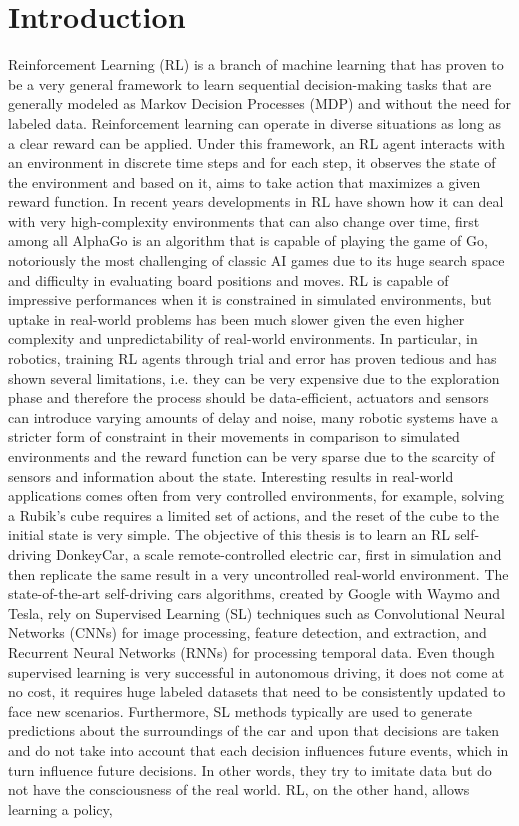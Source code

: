 \chapter{Introduction}

Reinforcement Learning (RL) is a branch of machine learning that has proven to be a very general framework to learn sequential decision-making tasks that are generally modeled as Markov Decision Processes (MDP) \citep{vanOtterlo2012} and without the need for labeled data. Reinforcement learning can operate in diverse situations as long as a clear reward can be applied. Under this framework, an RL agent interacts with an environment in discrete time steps and for each step, it observes the state of the environment and based on it, aims to take action that maximizes a given reward function. In recent years developments in RL have shown how it can deal with very high-complexity environments that can also change over time, first among all AlphaGo \citep{alphago} is an algorithm that is capable of playing the game of Go, notoriously the most challenging of classic AI games due to its huge search space and difficulty in evaluating board positions and moves. RL is capable of impressive performances when it is constrained in simulated environments, but uptake in real-world problems has been much slower given the even higher complexity and unpredictability of real-world environments. In particular, in robotics, training RL agents through trial and error has proven tedious and has shown several limitations, i.e. they can be very expensive due to the exploration phase and therefore the process should be data-efficient, actuators and sensors can introduce varying amounts of delay and noise, many robotic systems have a stricter form of constraint in their movements in comparison to simulated environments and the reward function can be very sparse due to the scarcity of sensors and information about the state. Interesting results in real-world applications comes often from very controlled environments, for example, solving a Rubik's cube requires a limited set of actions, and the reset of the cube to the initial state is very simple. The objective of this thesis is to learn an RL self-driving DonkeyCar, a scale remote-controlled electric car, first in simulation and then replicate the same result in a very uncontrolled real-world environment. The state-of-the-art self-driving cars algorithms, created by Google with Waymo and Tesla, rely on Supervised Learning (SL) techniques such as Convolutional Neural Networks (CNNs) for image processing, feature detection, and extraction, and Recurrent Neural Networks (RNNs) for processing temporal data. Even though supervised learning is very successful in autonomous driving, it does not come at no cost, it requires huge labeled datasets that need to be consistently updated to face new scenarios. Furthermore, SL methods typically are used to generate predictions about the surroundings of the car and upon that decisions are taken and do not take into account that each decision influences future events, which in turn influence future decisions. In other words, they try to imitate data but do not have the consciousness of the real world. RL, on the other hand, allows learning a policy, 